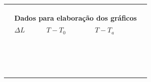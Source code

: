 \begin{table}[!ht]
\begin{tabular}{lllll}
		& \cellcolor[gray]{0.89} & \cellcolor[gray]{0.92} & \cellcolor[gray]{0.89} \\
		& \cellcolor[gray]{0.95} & \cellcolor[gray]{0.97} & \cellcolor[gray]{0.95} \\
		\cmidrule{2-4}
\\
		&\multicolumn{3}{l}{\textbf{Dados para elaboração dos gráficos}} \\
		\cmidrule{2-4}
		& $\Delta L$ & $T - T_0$ & $T - T_a$ \\
		\cmidrule{2-4}
		& \cellcolor[gray]{0.89} & \cellcolor[gray]{0.92} & \cellcolor[gray]{0.89} \\
		& \cellcolor[gray]{0.95} & \cellcolor[gray]{0.97} & \cellcolor[gray]{0.95} \\
		& \cellcolor[gray]{0.89} & \cellcolor[gray]{0.92} & \cellcolor[gray]{0.89} \\
		& \cellcolor[gray]{0.95} & \cellcolor[gray]{0.97} & \cellcolor[gray]{0.95} \\
		& \cellcolor[gray]{0.89} & \cellcolor[gray]{0.92} & \cellcolor[gray]{0.89} \\
		& \cellcolor[gray]{0.95} & \cellcolor[gray]{0.97} & \cellcolor[gray]{0.95} \\
		& \cellcolor[gray]{0.89} & \cellcolor[gray]{0.92} & \cellcolor[gray]{0.89} \\
		& \cellcolor[gray]{0.95} & \cellcolor[gray]{0.97} & \cellcolor[gray]{0.95} \\
		& \cellcolor[gray]{0.89} & \cellcolor[gray]{0.92} & \cellcolor[gray]{0.89} \\
		& \cellcolor[gray]{0.95} & \cellcolor[gray]{0.97} & \cellcolor[gray]{0.95} \\
		& \cellcolor[gray]{0.89} & \cellcolor[gray]{0.92} & \cellcolor[gray]{0.89} \\
		& \cellcolor[gray]{0.95} & \cellcolor[gray]{0.97} & \cellcolor[gray]{0.95} \\
		& \cellcolor[gray]{0.89} & \cellcolor[gray]{0.92} & \cellcolor[gray]{0.89} \\
		& \cellcolor[gray]{0.95} & \cellcolor[gray]{0.97} & \cellcolor[gray]{0.95} \\
		& \cellcolor[gray]{0.89} & \cellcolor[gray]{0.92} & \cellcolor[gray]{0.89} \\
		& \cellcolor[gray]{0.95} & \cellcolor[gray]{0.97} & \cellcolor[gray]{0.95} \\
		\bottomrule
	\end{tabular}
\end{table}

